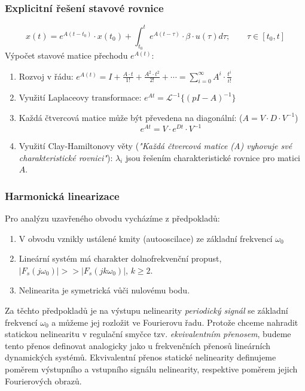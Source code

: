 \subsubsection*{Explicitní řešení stavové rovnice}
\begin{equation}
x(t) = e^{A(t-t_0)} \cdot x(t_0) + \displaystyle{\int_{t_0}^{t}} e^{A(t-\tau)} \cdot \beta \cdot u(\tau) d\tau; \qquad \tau \in \left[t_0, t\right]
\end{equation}
Výpočet stavové matice přechodu $ e^{A(t)} $:
\begin{enumerate}
\item Rozvoj v řádu: $ e^{A(t)} = I + \frac{A \cdot t}{1!} + \frac{A^2 \cdot t^2}{2!} + \cdots = \displaystyle{\sum_{i=0}^{\infty}} A^i \cdot \frac{t^i}{i!} $
\item Využití Laplaceovy transformace: $ e^{At} = \mathscr{L}^{-1}\{(pI-A)^{-1}\} $
\item Každá čtvercová matice může být převedena na diagonální: ($ A = V \cdot D \cdot V^{-1}$)
\begin{equation}
\qquad e^{At} = V \cdot e^{Dt} \cdot V^{-1}
\end{equation}
\item Využití Clay-Hamiltonovy věty (\textit{"Každá čtvercová matice (A) vyhovuje své charakteristické rovnici"}): $ \lambda_i $ jsou řešením charakteristické rovnice pro matici $ A $.
\vspace{3cm}
\end{enumerate}
\subsubsection*{Harmonická linearizace}
Pro analýzu uzavřeného obvodu vycházíme z předpokladů:
\begin{enumerate}
\item V obvodu vznikly ustálené kmity (autooscilace) ze základní frekvencí $ \omega_0 $
\item Lineární systém má charakter dolnofrekvenční propust, $ |F_s(j\omega_0)| >> |F_s(jk\omega_0)|, \, k \geq 2 $.
\item Nelinearita je symetrická vůči nulovému bodu.
\end{enumerate}
Za těchto předpokladů je na výstupu nelinearity \textit{periodický signál} se základní frekvencí $ \omega_0 $ a můžeme jej rozložit ve Fourierovu řadu. Protože chceme nahradit statickou nelinearitu v regulační smyčce tzv. \textit{ekvivalentním přenosem}, budeme tento přenos definovat analogicky jako u frekvenčních přenosů lineárních dynamických systémů. Ekvivalentní přenos statické nelinearity definujeme poměrem výstupního a vstupního signálu nelinearity, respektive poměrem jejich Fourierových obrazů.

